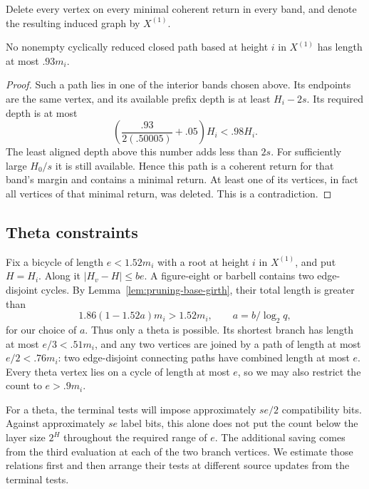 Delete every vertex on every minimal coherent return in every
band, and denote the resulting induced graph by $X^{(1)}$.

\begin{lemma}
\label{lem:pruning-base-girth}
No nonempty cyclically reduced closed path based at height $i$ in
$X^{(1)}$ has length at most $.93m_i$.
\end{lemma}

\begin{proof}
Such a path lies in one of the interior bands chosen above.  Its
endpoints are the same vertex, and its available prefix depth is
at least $H_i-2s$.  Its required depth is at most
\[
 \left(\frac{.93}{2(.50005)}+.05\right)H_i
 <.98H_i.
\]
The least aligned depth above this number adds less than $2s$.
For sufficiently large $H_0/s$ it is still available.  Hence this
path is a coherent return for that band's margin and contains
a minimal return.  At least one of its vertices, in fact all
vertices of that minimal return, was deleted.  This is a
contradiction.
\end{proof}

\subsection{Theta constraints}

Fix a bicycle of length $e<1.52m_i$ with a root at height $i$ in
$X^{(1)}$, and put $H=H_i$.  Along it
$|H_v-H|\leq be$.  A figure-eight or barbell contains two
edge-disjoint cycles.  By Lemma~\ref{lem:pruning-base-girth},
their total length is greater than
\[
 1.86(1-1.52a)m_i>1.52m_i,
 \qquad a=b/\log_2q,
\]
for our choice of $a$.  Thus only a theta is possible.  Its
shortest branch has length at most $e/3<.51m_i$, and any two
vertices are joined by a path of length at most $e/2<.76m_i$:
two edge-disjoint connecting paths have combined length at
most $e$.  Every theta vertex lies on a cycle of length at
most $e$, so we may also restrict the count to
$e>.9m_i$.

For a theta, the terminal tests will impose approximately $se/2$
compatibility bits.  Against approximately $se$ label bits, this alone
does not put the count below the layer size $2^H$ throughout the required
range of $e$.  The additional saving
comes from the third evaluation at each of the two branch vertices.
We estimate those relations first and then arrange their tests at
different source updates from the terminal tests.

